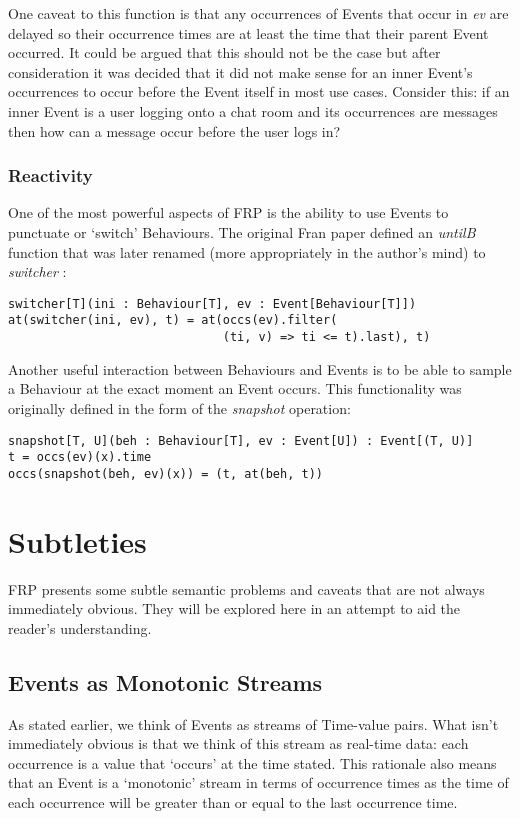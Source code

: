       One caveat to this function is that any occurrences of Events that occur in \emph{ev} are delayed
      so their occurrence times are at least the time that their parent Event occurred. It could be argued that this should 
      not be the case but after consideration it was decided that it did not make sense for an inner Event's occurrences to 
      occur before the Event itself
      in most use cases. Consider this: if an inner Event is a user logging onto a chat room and its occurrences are 
      messages then how can a message occur before the user logs in?
        
      \subsubsection{Reactivity}
        One of the most powerful aspects of FRP is the ability to use Events to punctuate or `switch' Behaviours.
        The original Fran paper defined an \emph{untilB} function that was later renamed (more appropriately in the
        author's mind) to \emph{switcher} \cite{Elliott2009}:

\begin{verbatim}
switcher[T](ini : Behaviour[T], ev : Event[Behaviour[T]])
at(switcher(ini, ev), t) = at(occs(ev).filter(
                              (ti, v) => ti <= t).last), t)
\end{verbatim}

        Another useful interaction between Behaviours and Events is to be able to sample
        a Behaviour at the exact moment an Event occurs. This functionality was originally defined in the
        form of the \emph{snapshot} operation:

\begin{verbatim}
snapshot[T, U](beh : Behaviour[T], ev : Event[U]) : Event[(T, U)]
t = occs(ev)(x).time
occs(snapshot(beh, ev)(x)) = (t, at(beh, t))
\end{verbatim} 
  
  \section{Subtleties}
    FRP presents some subtle semantic problems and caveats that are not always immediately obvious.
    They will be explored here in an attempt to aid the reader's understanding.
     
    \subsection{Events as Monotonic Streams}
      As stated earlier, we think of Events as streams of Time-value pairs. What isn't immediately
      obvious is that we think of this stream as real-time data: each occurrence is a value that
      `occurs' at the time stated. This rationale also means that an Event is a `monotonic' stream in terms of
      occurrence times as the time of each occurrence will be greater than or equal to the last occurrence
      time.
      
